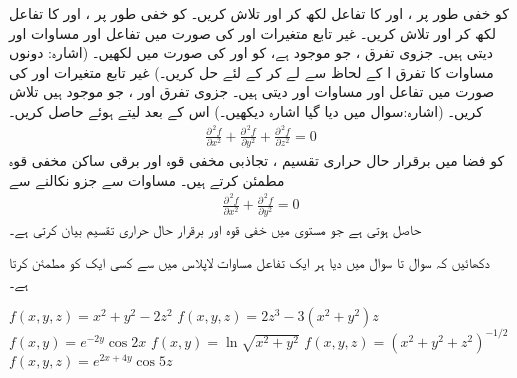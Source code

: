  کو خفی طور پر ،  اور  کا تفاعل لکھ کر  اور  تلاش کریں۔
 کو خفی طور پر ،  اور  کا تفاعل لکھ کر  اور  تلاش کریں۔
غیر تابع متغیرات  اور  کی صورت میں تفاعل   اور  مساوات  اور  دیتی ہیں۔ جزوی تفرق  ،  جو موجود ہے، کو  اور  کی صورت میں لکھیں۔ (اشارہ: دونوں مساوات کا تفرق   ا کے لحاظ سے لے کر  کے لئے حل کریں۔)
غیر تابع متغیرات  اور  کی صورت میں تفاعل   اور  مساوات  اور  دیتی ہیں۔ جزوی تفرق  اور   ،  جو موجود  ہیں تلاش کریں۔ (اشارہ:سوال  میں دیا گیا اشارہ دیکھیں۔)   اس کے بعد  لیتے ہوئے  حاصل کریں۔
\\
\begin{align}\label{مساوات_کثیر_المتغیر_مساوات_لاپلاس_الف}
\frac{\partial^{\,2}f}{\partial x^2}+\frac{\partial^{\,2}f}{\partial y^2}+\frac{\partial^{\,2}f}{\partial z^2}=0
\end{align}
کو فضا میں  برقرار حال حراری تقسیم ، تجاذبی  مخفی قوہ اور برقی ساکن مخفی قوہ   مطمئن کرتے ہیں۔ مساوات  سے جزو  نکالنے سے    
 \begin{align}\label{مساوات_کثیر_المتغیر_مساوات_لاپلاس_ب}
\frac{\partial^{\,2}f}{\partial x^2}+\frac{\partial^{\,2}f}{\partial y^2}=0
\end{align}
حاصل ہوتی ہے جو مستوی میں  خفی قوہ اور برقرار حال حراری تقسیم  بیان کرتی ہے۔

دکھائیں کہ سوال  تا سوال  میں  دیا ہر ایک  تفاعل مساوات لاپلاس میں سے کسی ایک کو مطمئن کرتا ہے۔ 

$f(x,y,z)=x^2+y^2-2z^2$
$f(x,y,z)=2z^3-3(x^2+y^2)z$
$f(x,y)=e^{-2y}\cos 2x$
$f(x,y)=\ln\sqrt{x^2+y^2}$
$f(x,y,z)=(x^2+y^2+z^2)^{-1/2}$
$f(x,y,z)=e^{2x+4y}\cos 5z$

